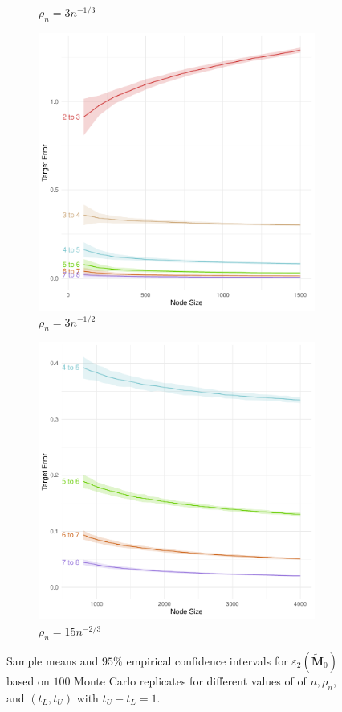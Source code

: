 \documentclass[10pt,journal,compsoc]{IEEEtran}
\numberwithin{equation}{section}
\begin{document}
\begin{figure}[htbp]
\begin{subfigure}{.49\columnwidth}
\caption{$\rho_n = 3n^{-1/3}$}
\end{subfigure}
\begin{subfigure}{.49\columnwidth}
\includegraphics[width=\columnwidth]{MR_12_1.pdf}%
\caption{$\rho_n = 3n^{-1/2}$}
\end{subfigure}
\begin{subfigure}{.49\columnwidth}
\includegraphics[width=\columnwidth]{MR_23_1.pdf}%
\caption{$\rho_n = 15n^{-2/3}$}
\end{subfigure}
\caption{Sample means and $95\%$ empirical confidence
    intervals for $\varepsilon_2(\tilde{\mathbf{M}}_0)$ based on $100$
    Monte Carlo replicates for different values of  of $n,\rho_n$, and
    $(t_L, t_U)$ with $t_U - t_L = 1$.}
\label{f:rate:3}
\end{figure}
\end{document}
